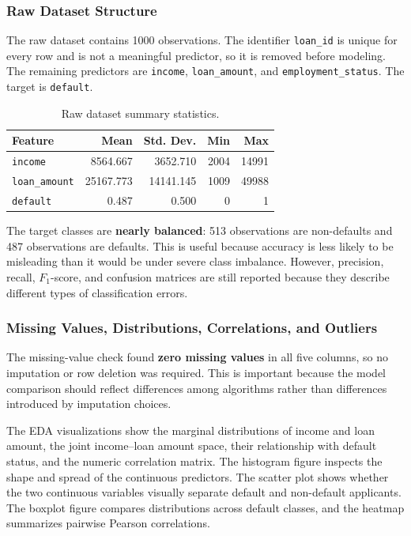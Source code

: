 \documentclass[12pt]{article}
\begin{document}
\subsubsection{Raw Dataset Structure}

The raw dataset contains 1000 observations. The identifier \texttt{loan\_id} is unique for every row and is not a meaningful predictor, so it is removed before modeling. The remaining predictors are \texttt{income}, \texttt{loan\_amount}, and \texttt{employment\_status}. The target is \texttt{default}.

\begin{table}[htbp]
\centering
\caption{Raw dataset summary statistics.}
\begin{tabular}{lrrrr}
\toprule
Feature & Mean & Std. Dev. & Min & Max \\
\midrule
\texttt{income} & 8564.667 & 3652.710 & 2004 & 14991 \\
\texttt{loan\_amount} & 25167.773 & 14141.145 & 1009 & 49988 \\
\texttt{default} & 0.487 & 0.500 & 0 & 1 \\
\bottomrule
\end{tabular}
\end{table}

The target classes are \textbf{nearly balanced}: 513 observations are non-defaults and 487 observations are defaults. This is useful because accuracy is less likely to be misleading than it would be under severe class imbalance. However, precision, recall, $F_1$-score, and confusion matrices are still reported because they describe different types of classification errors.

\subsubsection{Missing Values, Distributions, Correlations, and Outliers}

The missing-value check found \textbf{zero missing values} in all five columns, so no imputation or row deletion was required. This is important because the model comparison should reflect differences among algorithms rather than differences introduced by imputation choices.

The EDA visualizations show the marginal distributions of income and loan amount, the joint income--loan amount space, their relationship with default status, and the numeric correlation matrix. The histogram figure inspects the shape and spread of the continuous predictors. The scatter plot shows whether the two continuous variables visually separate default and non-default applicants. The boxplot figure compares distributions across default classes, and the heatmap summarizes pairwise Pearson correlations.
\end{document}

